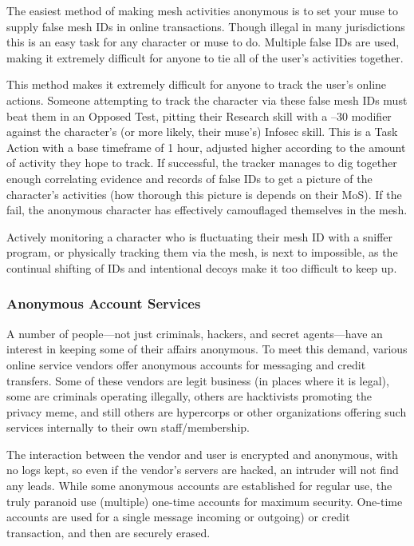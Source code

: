 The easiest method of making mesh activities anonymous
is to set your muse to supply false mesh IDs in
online transactions. Though illegal in many jurisdictions
this is an easy task for any character or muse to
do. Multiple false IDs are used, making it extremely difficult
for anyone to tie all of the user's activities together.

This method makes it extremely difficult for anyone 
to track the user's online actions. Someone attempting 
to track the character via these false mesh IDs must 
beat them in an Opposed Test, pitting their Research 
skill with a –30 modifier against the character's (or 
more likely, their muse's) Infosec skill. This is a Task 
Action with a base timeframe of 1 hour, adjusted 
higher according to the amount of activity they hope 
to track. If successful, the tracker manages to dig 
together enough correlating evidence and records of 
false IDs to get a picture of the character's activities 
(how thorough this picture is depends on their MoS). 
If the fail, the anonymous character has effectively 
camouflaged themselves in the mesh.

Actively monitoring a character who is fluctuating 
their mesh ID with a sniffer program, or physically 
tracking them via the mesh, is next to impossible, as 
the continual shifting of IDs and intentional decoys 
make it too difficult to keep up.

\subsubsection{Anonymous Account Services}

A number of people—not just criminals, hackers, and 
secret agents—have an interest in keeping some of 
their affairs anonymous. To meet this demand, various 
online service vendors offer anonymous accounts for 
messaging and credit transfers. Some of these vendors 
are legit business (in places where it is legal), some 
are criminals operating illegally, others are hacktivists 
promoting the privacy meme, and still others are hypercorps
or other organizations offering such services
internally to their own staff/membership.

The interaction between the vendor and user is 
encrypted and anonymous, with no logs kept, so even 
if the vendor's servers are hacked, an intruder will 
not find any leads. While some anonymous accounts 
are established for regular use, the truly paranoid use 
(multiple) one-time accounts for maximum security. 
One-time accounts are used for a single message incoming
or outgoing) or credit transaction, and then
are securely erased.

